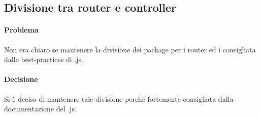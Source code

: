 \subsection{Divisione tra router e controller}
\paragraph{Problema}
Non era chiaro se mantenere la divisione dei package per i router ed i  consigliata dalle best-practices di .js.
\paragraph{Decisione}
Si è deciso di mantenere tale divisione perché fortemente consigliata dalla documentazione del  .js.
